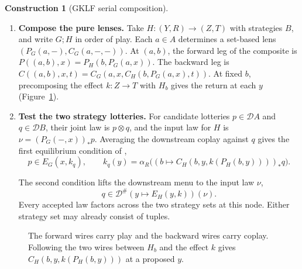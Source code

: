 \documentclass[11pt,a4paper]{article}
\theoremstyle{definition}
\newtheorem*{construction}{Construction}
\newcommand{\D}{\mathcal D}
\begin{document}
\begin{construction}[GKLF serial composition]\leavevmode
    \begin{enumerate}[titledsteps]
        \item \textbf{Compose the pure lenses.} Take $H:(Y,R)\to(Z,T)$ with strategies $B$, and write $G;H$ in order of play. Each $a\in A$ determines a set-based lens $(P_G(a,-),C_G(a,-,-))$. At $(a,b)$, the forward leg of the composite is $P((a,b),x)=P_H(b,P_G(a,x))$. The backward leg is $C((a,b),x,t)=C_G(a,x,C_H(b,P_G(a,x),t))$. At fixed $b$, precomposing the effect $k:Z\to T$ with $H_b$ gives the return at each $y$ (Figure~\ref{fig:serial}).

        \item \textbf{Test the two strategy lotteries.} For candidate lotteries $p\in\D A$ and $q\in\D B$, their joint law is $p\otimes q$, and the input law for $H$ is $\nu=(P_G(-,x))_*p$. Averaging the downstream coplay against $q$ gives the first equilibrium condition of \cite[Definitions~11--12]{gklf},
        \begin{equation}
            p\in E_G(x,k_q),\qquad k_q(y)=\alpha_R\bigl((b\mapsto C_H(b,y,k(P_H(b,y))))_*q\bigr).
            \label{eq:up}
        \end{equation}

        The second condition lifts the downstream menu to the input law $\nu$,
        \begin{equation}
            q\in\D^\#(y\mapsto E_H(y,k))(\nu).
            \label{eq:down}
        \end{equation}
        Every accepted law factors across the two strategy sets at this node. Either strategy set may already consist of tuples.
    \end{enumerate}
\end{construction}

\begin{figure}[!htbp]
    \centering\small
    \caption{The forward wires carry play and the backward wires carry coplay. Following the two wires between $H_b$ and the effect $k$ gives $C_H(b,y,k(P_H(b,y)))$ at a proposed $y$.}\label{fig:serial}
\end{figure}
\end{document}
